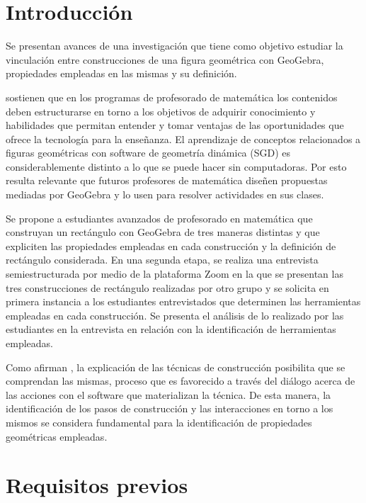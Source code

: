 \documentclass[oneside,spanish]{amsart}
\numberwithin{equation}{section}
\numberwithin{figure}{section}
\theoremstyle{definition}
\begin{document}
\section{Introducción}

Se presentan avances de una investigación que tiene como objetivo estudiar la vinculación entre construcciones de una figura geométrica con GeoGebra, propiedades empleadas en las mismas y su definición.

\citet{horzum17} sostienen que en los programas de profesorado de matemática los contenidos deben estructurarse en torno a los objetivos de adquirir conocimiento y habilidades que permitan entender y tomar ventajas de las oportunidades que ofrece la tecnología para la enseñanza. El aprendizaje de conceptos relacionados a figuras geométricas con software de geometría dinámica (SGD) es considerablemente distinto a lo que se puede hacer sin computadoras. Por esto resulta relevante que futuros profesores de matemática diseñen propuestas mediadas por GeoGebra y lo usen para resolver actividades en sus clases.

Se propone a estudiantes avanzados de profesorado en matemática que construyan un rectángulo con GeoGebra de tres maneras distintas y que expliciten las propiedades empleadas en cada construcción y la definición de rectángulo considerada. En una segunda etapa, se realiza una entrevista semiestructurada por medio de la plataforma Zoom en la que se presentan las tres construcciones de rectángulo realizadas por otro grupo y se solicita en primera instancia a los estudiantes entrevistados que determinen las herramientas empleadas en cada construcción. Se presenta el análisis de lo realizado por las estudiantes en la entrevista en relación con la identificación de herramientas empleadas.

Como afirman \citet{sanchez19}, la explicación de las técnicas de construcción posibilita que se comprendan las mismas, proceso que es favorecido a través del diálogo acerca de las acciones con el software que materializan la técnica. De esta manera, la identificación de los pasos de construcción y las interacciones en torno a los mismos se considera fundamental para la identificación de propiedades geométricas empleadas.

\section{Requisitos previos}
\end{document}
